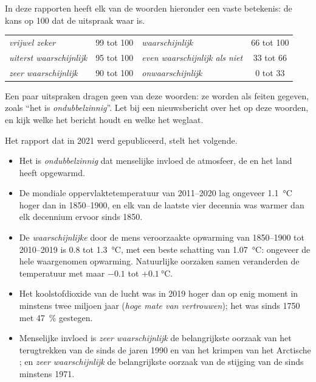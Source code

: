 In deze rapporten heeft elk van de woorden hieronder een vaste betekenis:
de kans op 100 dat de uitspraak waar is.

\begin{center}
{\small
\begin{tabular}{|l|c||l|c|}
\hline
\emph{vrijwel zeker} & 99 tot 100 & \emph{waarschijnlijk} & 66 tot 100 \\
\emph{uiterst waarschijnlijk} & 95 tot 100 & \emph{even waarschijnlijk als niet} & 33 tot 66 \\
\emph{zeer waarschijnlijk} & 90 tot 100 & \emph{onwaarschijnlijk} & 0 tot 33 \\
\hline
\end{tabular}}
\end{center}

\noindent Een paar uitspraken dragen geen van deze woorden: ze worden als
feiten gegeven, zoals ``het is \emph{ondubbelzinnig}''. Let bij een
nieuwsbericht over het  op deze woorden, en kijk welke het bericht
houdt en welke het weglaat.

Het rapport dat in 2021 werd gepubliceerd, stelt het volgende.
\begin{itemize}
  \item Het is \emph{ondubbelzinnig} dat menselijke invloed de atmosfeer,
        de  en het land heeft opgewarmd.
  \item De mondiale oppervlaktetemperatuur van 2011--2020 lag ongeveer
        \qty{1.1}{\degreeCelsius} hoger dan in 1850--1900, en elk van de
        laatste vier decennia was warmer dan elk decennium ervoor sinds
        1850.
  \item De \emph{waarschijnlijke} door de mens veroorzaakte opwarming van
        1850--1900 tot 2010--2019 is 0.8 tot \qty{1.3}{\degreeCelsius},
        met een beste schatting van \qty{1.07}{\degreeCelsius}: ongeveer
        de hele waargenomen opwarming. Natuurlijke oorzaken samen
        veranderden de temperatuur met maar $-0.1$ tot $+\qty{0.1}{\degreeCelsius}$.
  \item Het koolstofdioxide van de lucht was in 2019 hoger dan op enig
        moment in minstens twee miljoen jaar (\emph{hoge mate van
        vertrouwen}); het was sinds 1750 met 47~\% gestegen.
  \item Menselijke invloed is \emph{zeer waarschijnlijk} de belangrijkste
        oorzaak van het terugtrekken van de  sinds de jaren 1990
        en van het krimpen van het Arctische ; en \emph{zeer
        waarschijnlijk} de belangrijkste oorzaak van de stijging van de
         sinds minstens 1971.
\end{itemize}


